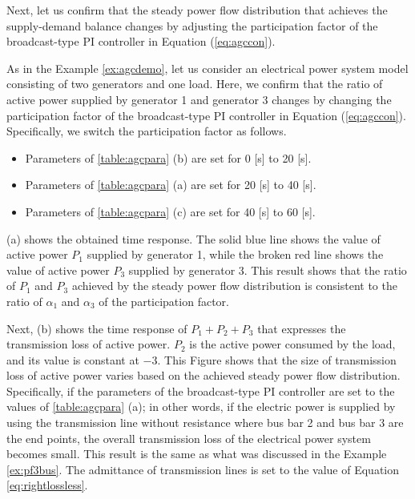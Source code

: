 \documentclass[tombow,dvipdfmx]{corona-a5-1.1}
\begin{document}
Next, let us confirm that the steady power flow distribution that achieves the supply-demand balance changes by adjusting the participation factor of the broadcast-type PI controller in Equation  (\ref{eq:agccon}).

\begin{例}\label{ex:pfvary}
As in the Example \ref{ex:agcdemo}, let us consider an electrical power system model consisting of two generators and one load.
Here, we confirm that the ratio of active power supplied by generator 1 and generator 3 changes by changing the participation factor of the broadcast-type PI controller in Equation (\ref{eq:agccon}).
Specifically, we switch the participation factor as follows.

\begin{itemize}
\item Parameters of \ref{table:agcpara} (b) are set for 0 [s] to 20 [s].
\item Parameters of \ref{table:agcpara} (a) are set for 20 [s] to 40 [s].
\item Parameters of \ref{table:agcpara} (c) are set for 40 [s] to 60 [s].
\end{itemize}

(a) shows the obtained time response.
The solid blue line shows the value of active power $P_1$ supplied by generator 1, while the broken red line shows the value of active power $P_3$ supplied by generator 3.
This result shows that the ratio of $P_1$ and $P_3$ achieved by the steady power flow distribution is consistent to the ratio of $\alpha_1$ and $\alpha_3$ of the participation factor.

Next, (b) shows the time response of $P_1+P_2+P_3$ that expresses the transmission loss of active power.
$P_2$ is the active power consumed by the load, and its value is constant at $-3$.
This Figure shows that the size of transmission loss of active power varies based on the achieved steady power flow distribution.
Specifically, if the parameters of the broadcast-type PI controller are set to the values of \ref{table:agcpara} (a); in other words, if the electric power is supplied by using the transmission line without resistance where bus bar 2 and bus bar 3 are the end points, the overall transmission loss of the electrical power system becomes small. This result is the same as what was discussed in the Example \ref{ex:pf3bus}. The admittance of transmission lines is set to the value of Equation \ref{eq:rightlossless}.
\end{例}
\end{document}
